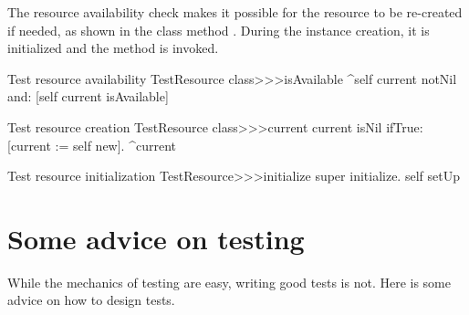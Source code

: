 \documentclass[a4paper,10pt,twoside]{book}
\begin{document}
The resource availability check makes it possible for the resource to be 
re-created if needed, as shown in the class method .  During the 
instance creation, it is initialized and the method  is
invoked.


\begin{method}[testresourceisavailable]{Test resource availability}
TestResource class>>>isAvailable
	^self current notNil and: [self current isAvailable]
\end{method}
\begin{method}[testresourcecurrent]{Test resource creation}
TestResource class>>>current
	current isNil ifTrue: [current := self new].
	^current
\end{method}
\begin{method}[restresourceinitialize]{Test resource initialization}
TestResource>>>initialize
	super initialize.
	self setUp
\end{method}
\section{Some advice on testing}

While the mechanics of testing are easy, writing good tests is not.
Here is some advice on how to design tests.
\end{document}
